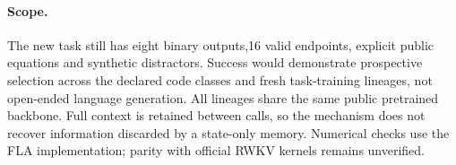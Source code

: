 \paragraph{Scope.}
The new task still has eight binary outputs,16 valid endpoints, explicit public
equations and synthetic distractors. Success would demonstrate prospective
selection across the declared code classes and fresh task-training lineages,
not open-ended language generation. All lineages share the same public pretrained
backbone. Full context is retained between calls, so the mechanism does not
recover information discarded by a state-only memory. Numerical checks use the
FLA implementation; parity with official RWKV kernels remains unverified.
